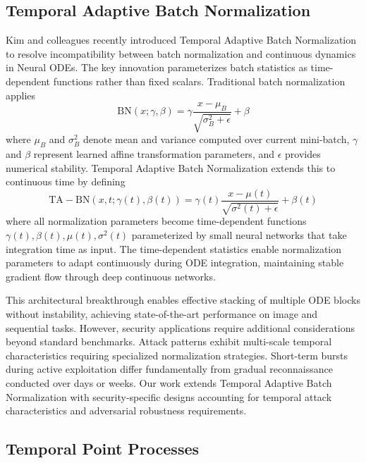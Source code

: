 \documentclass[10pt,journal,compsoc]{IEEEtran}
\begin{document}
\subsection{Temporal Adaptive Batch Normalization}

Kim and colleagues recently introduced Temporal Adaptive Batch Normalization to resolve incompatibility between batch normalization and continuous dynamics in Neural ODEs. The key innovation parameterizes batch statistics as time-dependent functions rather than fixed scalars. Traditional batch normalization applies
\begin{equation}
\mathrm{BN}(x; \gamma, \beta) = \gamma \frac{x - \mu_B}{\sqrt{\sigma_B^2 + \epsilon}} + \beta
\end{equation}
where $\mu_B$ and $\sigma_B^2$ denote mean and variance computed over current mini-batch, $\gamma$ and $\beta$ represent learned affine transformation parameters, and $\epsilon$ provides numerical stability. Temporal Adaptive Batch Normalization extends this to continuous time by defining
\begin{equation}
\mathrm{TA-BN}(x, t; \gamma(t), \beta(t)) = \gamma(t) \frac{x - \mu(t)}{\sqrt{\sigma^2(t) + \epsilon}} + \beta(t)
\end{equation}
where all normalization parameters become time-dependent functions $\gamma(t), \beta(t), \mu(t), \sigma^2(t)$ parameterized by small neural networks that take integration time as input. The time-dependent statistics enable normalization parameters to adapt continuously during ODE integration, maintaining stable gradient flow through deep continuous networks.

This architectural breakthrough enables effective stacking of multiple ODE blocks without instability, achieving state-of-the-art performance on image and sequential tasks. However, security applications require additional considerations beyond standard benchmarks. Attack patterns exhibit multi-scale temporal characteristics requiring specialized normalization strategies. Short-term bursts during active exploitation differ fundamentally from gradual reconnaissance conducted over days or weeks. Our work extends Temporal Adaptive Batch Normalization with security-specific designs accounting for temporal attack characteristics and adversarial robustness requirements.

\subsection{Temporal Point Processes}
\end{document}

